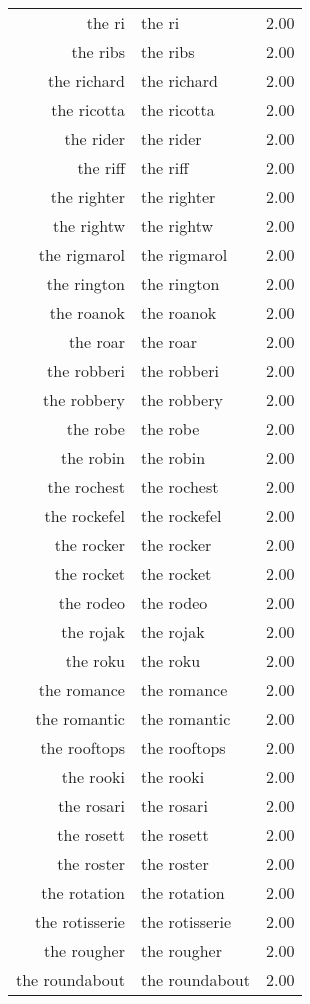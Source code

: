 \begin{table}[ht]
\begin{tabular}{rlr}
  the ri & the ri & 2.00 \\ 
  the ribs & the ribs & 2.00 \\ 
  the richard & the richard & 2.00 \\ 
  the ricotta & the ricotta & 2.00 \\ 
  the rider & the rider & 2.00 \\ 
  the riff & the riff & 2.00 \\ 
  the righter & the righter & 2.00 \\ 
  the rightw & the rightw & 2.00 \\ 
  the rigmarol & the rigmarol & 2.00 \\ 
  the rington & the rington & 2.00 \\ 
  the roanok & the roanok & 2.00 \\ 
  the roar & the roar & 2.00 \\ 
  the robberi & the robberi & 2.00 \\ 
  the robbery & the robbery & 2.00 \\ 
  the robe & the robe & 2.00 \\ 
  the robin & the robin & 2.00 \\ 
  the rochest & the rochest & 2.00 \\ 
  the rockefel & the rockefel & 2.00 \\ 
  the rocker & the rocker & 2.00 \\ 
  the rocket & the rocket & 2.00 \\ 
  the rodeo & the rodeo & 2.00 \\ 
  the rojak & the rojak & 2.00 \\ 
  the roku & the roku & 2.00 \\ 
  the romance & the romance & 2.00 \\ 
  the romantic & the romantic & 2.00 \\ 
  the rooftops & the rooftops & 2.00 \\ 
  the rooki & the rooki & 2.00 \\ 
  the rosari & the rosari & 2.00 \\ 
  the rosett & the rosett & 2.00 \\ 
  the roster & the roster & 2.00 \\ 
  the rotation & the rotation & 2.00 \\ 
  the rotisserie & the rotisserie & 2.00 \\ 
  the rougher & the rougher & 2.00 \\ 
  the roundabout & the roundabout & 2.00 \\ 

\end{tabular}
\end{table}
